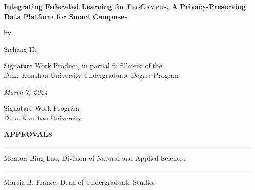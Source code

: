\documentclass[11pt,a4paper,oneside]{report}
\newcommand{\fedcampus}{\textsc{FedCampus}\xspace}
\begin{document}
\newcommand{\authorname}{Sichang He}

\newcommand{\thetitle}{Integrating Federated Learning for \fedcampus,
    A Privacy-Preserving Data Platform for Smart Campuses
}

\newcommand{\submissiondate}{March 7, 2024}

\newcommand{\mentor}{Bing Luo}

\newcommand{\academicunit}{Division of Natural and Applied Sciences}



\begin{titlepage}

    \vspace*{\bigskipamount}

    \begin{center}
        {\sffamily\LARGE\bfseries\MakeUppercase\thetitle\par}

        \bigskip

        by

        \bigskip

        {\Large \authorname}

        \bigskip

        Signature Work Product, in partial fulfillment of the \\
        Duke Kunshan University Undergraduate Degree Program

        \bigskip

        \emph{\submissiondate}

        \bigskip

        Signature Work Program \\
        Duke Kunshan University

    \end{center}

    \vfill

    \textbf{\textsf{APPROVALS}}

    \bigskip\bigskip\bigskip
    \hrule

    Mentor: \mentor, \academicunit

    \bigskip\bigskip\bigskip
    \hrule

    Marcia B. France, Dean of Undergraduate Studies

\end{titlepage}
\end{document}
